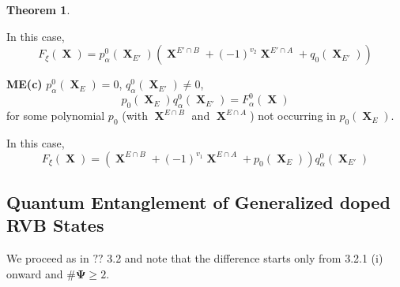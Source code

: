 \documentclass[a4paper,12pt]{article}
\DeclareMathOperator{\x}{\mathrm{X}}
\theoremstyle{definition}
\theoremstyle{underlinethm}
\newtheorem{thm}{Theorem}[section]
\theoremstyle{definition}
\begin{document}
\begin{thm}
\begin{enumerate}[label = (\roman*)]
In this case, \begin{equation}F_{\xi}(\boldsymbol{\x}) = p_{\alpha}^{0} (\boldsymbol{\x}_{E'}) \left(\boldsymbol{\x}^{E' \cap B} + (-1)^{v_{2}} \boldsymbol{\x}^{E' \cap A}  + q_{0} (\boldsymbol{\x}_{E'})\right)\tag{4.48}\label{eq-4.48}\end{equation}

\textbf{ME(c)} $p_{\alpha}^{0} (\boldsymbol{\x}_{E})= 0$, $q_{\alpha}^{0} (\boldsymbol{\x}_{E'}) \neq 0$,
\begin{equation}
p_{0}(\boldsymbol{\x}_{E}) q_{\alpha}^{0}(\boldsymbol{\x}_{E'}) = F_{\alpha}^{0}(\boldsymbol{\x})\tag{4.49}\label{eq-4.49}
\end{equation} 
for some polynomial $p_{0}$ (with $\boldsymbol{\x}^{E \cap B}$ and $\boldsymbol{\x}^{E \cap A}$) not occurring in $p_{0}(\boldsymbol{\x}_{E})$.

In this case, 
\begin{equation}
F_{\xi}(\boldsymbol{\x}) = \left(\boldsymbol{\x}^{E \cap B} + (-1)^{v_{1}} \boldsymbol{\x}^{E \cap A} + p_{0} (\boldsymbol{\x}_{E}) \right) q_{\alpha}^{0}(\boldsymbol{\x}_{E'})\tag{4.50} \label{eq-4.50}
\end{equation}

\end{enumerate}

\end{thm}

\subsection{Quantum Entanglement of Generalized doped RVB States}\label{subsection-4.4}

We proceed as in $??$ 3.2 and note that the difference starts only from 3.2.1 (i) onward and $\# \boldsymbol{\Psi} \geq 2$.
\end{document}
